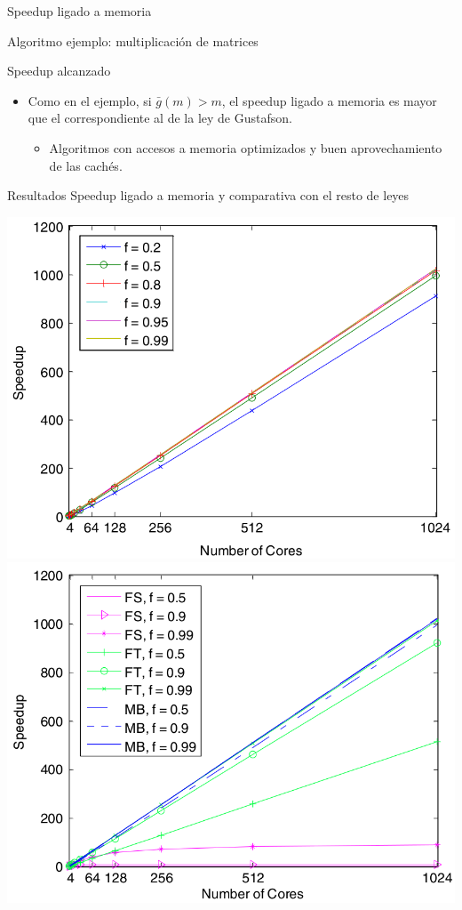 \documentclass[utf8]{beamer}
\begin{document}
\begin{frame}[allowframebreaks]{Speedup ligado a memoria}
\begin{block}{Algoritmo ejemplo: multiplicación de matrices}
    \end{block}
    \begin{block}{Speedup alcanzado}
        \begin{itemize}
            \item Como en el ejemplo, si $\bar{g}(m) > m$, el speedup ligado a memoria es mayor que el correspondiente al de la ley de Gustafson.
                \begin{itemize}
                    \item Algoritmos con accesos a memoria optimizados y buen aprovechamiento de las cachés.
                \end{itemize}
        \end{itemize}
    \end{block}
    \begin{block}{Resultados}
        Speedup ligado a memoria y comparativa con el resto de leyes
    \end{block}
    \begin{center}
        \includegraphics[width=.5\linewidth]{figures/mb_speedup}
        \includegraphics[width=.5\linewidth]{figures/all_speedups}
    \end{center}
\end{frame}
\end{document}
